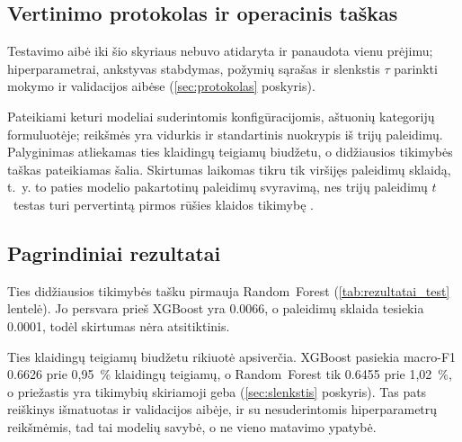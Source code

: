 
\subsection{Vertinimo protokolas ir operacinis taškas}
\label{sec:vertinimo_protokolas}

Testavimo aibė iki šio skyriaus nebuvo atidaryta ir panaudota vienu
prėjimu; hiperparametrai, ankstyvas stabdymas, požymių sąrašas ir
slenkstis $\tau$ parinkti mokymo ir validacijos aibėse
(\ref{sec:protokolas} poskyris).

Pateikiami keturi modeliai suderintomis konfigūracijomis, aštuonių
kategorijų formuluotėje; reikšmės yra vidurkis ir standartinis nuokrypis
iš trijų paleidimų. Palyginimas atliekamas ties klaidingų teigiamų
biudžetu, o didžiausios tikimybės taškas pateikiamas šalia. Skirtumas
laikomas tikru tik viršijęs paleidimų sklaidą, t.~y. to paties modelio
pakartotinų paleidimų svyravimą, nes trijų paleidimų
$t$~testas turi pervertintą pirmos rūšies klaidos tikimybę
\cite{dietterich1998tests}.


\subsection{Pagrindiniai rezultatai}
\label{sec:pagrindiniai_rezultatai}

Ties didžiausios tikimybės tašku pirmauja Random~Forest
(\ref{tab:rezultatai_test} lentelė). Jo persvara prieš XGBoost yra
\num{0.0066}, o paleidimų sklaida tesiekia \num{0.0001}, todėl
skirtumas nėra atsitiktinis.

\begin{table}[htbp]
\centering
\caption{Aptikimo kokybė testavimo aibėje.}
\label{tab:rezultatai_test}
\end{table}


Ties klaidingų teigiamų biudžetu rikiuotė apsiverčia. XGBoost pasiekia
macro-F1 \num{0.6626} prie 0,95~\% klaidingų teigiamų, o Random~Forest
tik \num{0.6455} prie 1,02~\%, o priežastis yra tikimybių skiriamoji
geba (\ref{sec:slenkstis} poskyris). Tas pats reiškinys
išmatuotas ir validacijos aibėje, ir su nesuderintomis hiperparametrų
reikšmėmis, tad tai modelių savybė, o ne vieno matavimo ypatybė.


